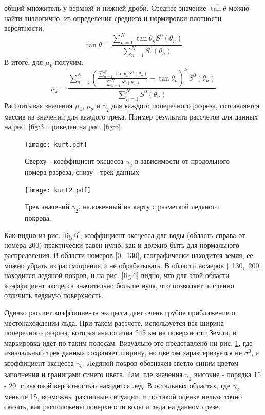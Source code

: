 общий множитель у верхней и нижней дроби. Среднее значение $\overline{\tan\theta}$ можно найти аналогично, из
определения среднего и нормировки плотности вероятности:
\begin{equation}
  \overline{\tan\theta} = \frac{\sum \limits_{n = 1}^{N} \tan \theta_n S^0(\theta_n) }{\sum \limits_{n = 1}^{N} S^0(\theta_n)}
  \label{eq:18}
\end{equation}
В итоге, для $\mu_k$ получим:
\begin{equation}
  \mu_k = \frac{\sum \limits_{n = 1}^{N} (\frac{\sum \limits_{n = 1}^{N} \tan \theta_n S^0(\theta_n) }{\sum \limits_{n = 1}^{N} S^0(\theta_n)} - \tan \theta_n)^k~ S^0(\theta_n)}{\sum \limits_{n = 1}^{N} S^0(\theta_n) }
  \label{eq:19}
\end{equation}
Рассчитывая значения $\mu_4$, $\mu_2$ и $\gamma_2$ для каждого поперечного разреза, сотсавляется массив из значений для
каждого трека. Пример результата рассчетов для данных на рис. \ref{fig:3} приведен на рис. \ref{fig:6}.

\begin{figure}[h!]
  \centering
  \begin{minipage}{0.50\linewidth}
    \centering
    \texttt{[image: kurt.pdf]}
    \caption{Сверху - коэффициент эксцесса $\gamma_2$ в зависимости от продольного номера разреза, снизу - трек данных}
    \label{fig:6}
  \end{minipage}
  \begin{minipage}{0.40\linewidth}
    \centering
    \texttt{[image: kurt2.pdf]}
    \caption{Трек значений $\gamma_2$, наложенный на карту с разметкой ледяного покрова.}
    \label{fig:7}
  \end{minipage}
\end{figure}


Как видно из рис. \ref{fig:6}, коэффициент эксцесса для воды (область справа от номера 200) практически равен нулю, как
и должно быть для нормального распределения. В области номеров [0,~130], географически находится
земля, ее можно убрать из рассмотрения и не обрабатывать. В области номеров [~130,~200] находится ледяной покров, и на  рис. \ref{fig:6}
видно, что для этой области коэффициент эксцесса значительно больше нуля, что позволяет численно отличить ледяную поверхность.

Однако рассчет коэффициента эксцесса дает очень грубое приближение о местонахождении льда. При таком рассчете,
используется вся ширина поперечного разреза, которая аналогична 245 км на поверхности Земли, и маркировка идет по
таким полосам. Визуально это представлено ни рис. \ref{fig:7}, где изначальный трек данных сохраняет ширину, но цветом
характеризуется не $\sigma^0$, а коэффициент эксцесса $\gamma_2$. Ледяной покров обозначен светло-синим цветом заполнения и
границами синего цвета. Там, где значения $\gamma_2$ высокие - порядка 15 - 20, с высокой вероятностью находится лед. В
остальных областях, где $\gamma_2$ меньше 15, возможны различные ситуации, и по такой оценке нельзя точно сказать, как
расположены поверхности воды и льда на данном срезе. 



